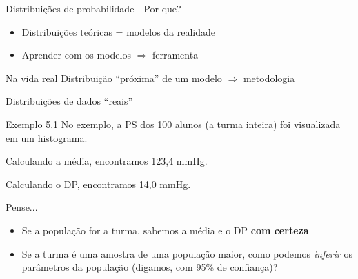 \documentclass{beamer}
\begin{document}
\begin{frame}{Distribuições de probabilidade - Por que?}
  \begin{itemize}
  \item Distribuições teóricas = \alert{modelos} da realidade
  \item Aprender com os modelos $\Rightarrow$ ferramenta
  \end{itemize}
  \begin{block}{Na vida real}
    Distribuição ``próxima'' de um modelo $\Rightarrow$ metodologia
  \end{block}
\end{frame}

\begin{frame}[label=exemplo5.1]{Distribuições de dados ``reais''}
  \begin{exampleblock}{Exemplo 5.1}
    No exemplo, a PS dos 100 alunos (a turma inteira) foi visualizada em um histograma.

    Calculando a média, encontramos 123,4 mmHg.

    Calculando o DP, encontramos 14,0 mmHg.
  \end{exampleblock}
  \begin{block}{Pense...}
    \begin{itemize}
    \item Se a população for a turma, sabemos a média e o DP {\bf com certeza}
    \item Se a turma é uma amostra de uma população maior, como podemos {\em inferir} os parâmetros da população (digamos, com 95\% de confiança)?
    \end{itemize}
  \end{block}
\end{frame}
\end{document}
